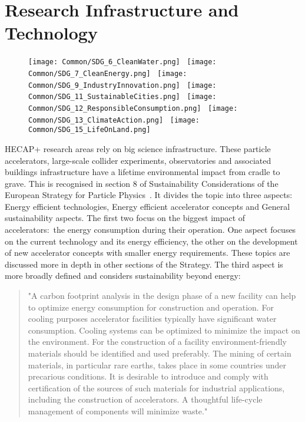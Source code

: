 \documentclass[../SustainableHEP.tex]{subfiles}
\begin{document}
\RaggedRight
\sloppy
\newpage


\section{Research Infrastructure and Technology}
\label{sec:Technology}


\begin{figure}
    \texttt{[image: Common/SDG\_6\_CleanWater.png]}~%
    \texttt{[image: Common/SDG\_7\_CleanEnergy.png]}~%
    \texttt{[image: Common/SDG\_9\_IndustryInnovation.png]}~%
    \texttt{[image: Common/SDG\_11\_SustainableCities.png]}~%
    \texttt{[image: Common/SDG\_12\_ResponsibleConsumption.png]}~%
    \texttt{[image: Common/SDG\_13\_ClimateAction.png]}~%
    \texttt{[image: Common/SDG\_15\_LifeOnLand.png]}
\end{figure}


\exSum

\noindent HECAP+ research areas rely on big science infrastructure. These particle accelerators, large-scale collider experiments, observatories and associated buildings infrastructure have a lifetime environmental impact from cradle to grave. This is recognised in section 8 of Sustainability Considerations of the European Strategy for Particle Physics~\cite{EuropStrategyPP}. It divides the topic into three aspects: Energy efficient technologies, Energy efficient accelerator concepts and General sustainability aspects. The first two focus on the biggest impact of accelerators:\ the energy consumption during their operation. One aspect focuses on the current technology and its energy efficiency, the other on the development of new accelerator concepts with smaller energy requirements. These topics are discussed more in depth in other sections of the Strategy. The third aspect is more broadly defined and considers sustainability beyond energy:

\begin{quotation}
    "A carbon footprint analysis in the design phase of a new facility can help to optimize energy consumption for construction and operation. For cooling purposes accelerator facilities typically have significant water consumption. Cooling systems can be optimized to minimize the impact on the environment. For the construction of a facility environment-friendly materials should be identified and used preferably. The mining of certain materials, in particular rare earths, takes place in some countries under precarious conditions. It is desirable to introduce and comply with certification of the sources of such materials for industrial applications, including the construction of accelerators. A thoughtful life-cycle management of components will minimize waste."
\end{quotation}
\end{document}
